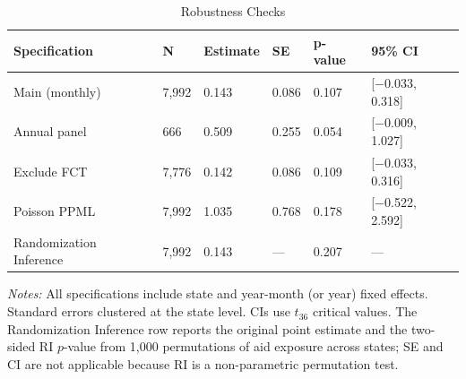 \begin{table}[ht]
\centering
\begin{tabular}{llllll}
  \toprule
Specification & N & Estimate & SE & p-value & 95\% CI \\ 
  \midrule
Main (monthly) & 7,992 & 0.143 & 0.086 & 0.107 & [$-$0.033, 0.318] \\
  Annual panel &   666 & 0.509 & 0.255 & 0.054 & [$-$0.009, 1.027] \\
  Exclude FCT & 7,776 & 0.142 & 0.086 & 0.109 & [$-$0.033, 0.316] \\
  Poisson PPML & 7,992 & 1.035 & 0.768 & 0.178 & [$-$0.522, 2.592] \\
  Randomization Inference & 7,992 & 0.143 & --- & 0.207 & --- \\
   \bottomrule
\end{tabular}
\par\vspace{0.3em}
{\footnotesize \emph{Notes:} All specifications include state and year-month (or year) fixed effects. Standard errors clustered at the state level. CIs use $t_{36}$ critical values. The Randomization Inference row reports the original point estimate and the two-sided RI $p$-value from 1,000 permutations of aid exposure across states; SE and CI are not applicable because RI is a non-parametric permutation test.}
\caption{Robustness Checks}
\label{tab:robustness}
\end{table}
